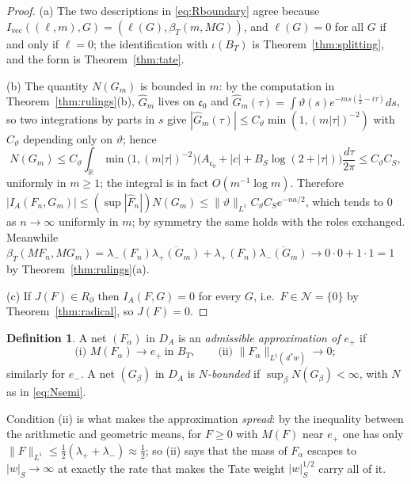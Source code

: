 \documentclass[11pt]{amsart}
\theoremstyle{definition}
\newtheorem{definition}[theorem]{Definition}
\theoremstyle{remark}
\newcommand{\R}{\mathbb R}
\newcommand{\dstar}{\,d^{*}}
\newcommand{\DA}{D_A}
\newcommand{\Nrad}{\mathcal N}
\newcommand{\BT}{B_T}
\begin{document}
\begin{proof}
(a)  The two descriptions in \eqref{eq:Rboundary} agree because
$I_{\mathrm{vec}}((\ell,m),G)=(\ell(G),\beta_T(m,MG))$, and $\ell(G)=0$ for all
$G$ if and only if $\ell=0$; the identification with $\iota(\BT)$ is
Theorem~\ref{thm:splitting}, and the form is Theorem~\ref{thm:tate}.

(b)  The quantity $N(G_m)$ is bounded in $m$: by the computation in
Theorem~\ref{thm:rulings}(b), $\widehat G_m$ lives on $\mathfrak c_0$ and
$\widehat G_m(\tau)=\int\vartheta(s)e^{-ms(\frac12-i\tau)}ds$, so two integrations
by parts in $s$ give $|\widehat G_m(\tau)|\le C_{\vartheta}\min(1,(m|\tau|)^{-2})$
with $C_{\vartheta}$ depending only on $\vartheta$; hence
\[
N(G_m)\le C_{\vartheta}\int_{\R}\min\bigl(1,(m|\tau|)^{-2}\bigr)
\bigl(A_{\mathfrak c_0}+|c|+B_S\log(2+|\tau|)\bigr)\frac{d\tau}{2\pi}\le C_{\vartheta}C_S ,
\]
uniformly in $m\ge1$; the integral is in fact $O(m^{-1}\log m)$.  Therefore
$|I_A(F_n,G_m)|\le(\sup|\widehat F_n|)N(G_m)\le\lVert\vartheta\rVert_{L^1}
C_{\vartheta}C_Se^{-na/2}$, which tends to $0$ as $n\to\infty$ uniformly in $m$; by
symmetry the same holds with the roles exchanged.  Meanwhile
$\beta_T(MF_n,MG_m)=\lambda_-(F_n)\overline{\lambda_+(G_m)}+
\lambda_+(F_n)\overline{\lambda_-(G_m)}\to0\cdot0+1\cdot1=1$ by
Theorem~\ref{thm:rulings}(a).

(c)  If $J(F)\in R_{\partial}$ then $I_A(F,G)=0$ for every $G$, i.e.\
$F\in\Nrad=\{0\}$ by Theorem~\ref{thm:radical}, so $J(F)=0$.
\end{proof}

\begin{definition}\label{def:admissible}
A net $(F_{\alpha})$ in $\DA$ is an \emph{admissible approximation of $e_+$} if
\begin{equation}\label{eq:admissible}
\text{(i) } M(F_{\alpha})\to e_+\ \text{in }\BT,\qquad
\text{(ii) } \lVert F_{\alpha}\rVert_{L^1(\dstar w)}\to0 ;
\end{equation}
similarly for $e_-$.  A net $(G_{\beta})$ in $\DA$ is \emph{$N$-bounded} if
$\sup_{\beta}N(G_{\beta})<\infty$, with $N$ as in \eqref{eq:Nsemi}.
\end{definition}

Condition (ii) is what makes the approximation \emph{spread}: by
the inequality between the arithmetic and geometric means, for $F\ge0$ with
$M(F)$ near $e_+$ one has only $\lVert F\rVert_{L^1}\le\tfrac12(\lambda_++
\lambda_-)\approx\tfrac12$; so (ii) says that the mass of $F_{\alpha}$ escapes
to $|w|_S\to\infty$ at exactly the rate that makes the Tate weight
$|w|_S^{1/2}$ carry all of it.
\end{document}
